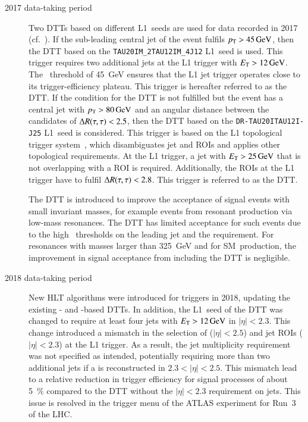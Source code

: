 \begin{description}
\item[2017 data-taking period] Two DTTs based on different L1~seeds are used for
  data recorded in 2017 (cf.~). If the sub-leading
  central jet of the event fulfils $p_{\text{T}} > \SI{45}{\ensuremath{\text{GeV}}}$, then the DTT based on
  the \texttt{TAU20IM\_2TAU12IM\_4J12} L1~seed is used. This trigger requires
  two additional jets at the L1 trigger with $\ET > \SI{12}{\GeV}$. The
  \pT~threshold of \SI{45}{\GeV} ensures that the L1 jet trigger operates close
  to its trigger-efficiency plateau. This trigger is hereafter referred to as
  the \FourJTwelve DTT. If the condition for the \FourJTwelve DTT is not
  fulfilled but the event has a central jet with $\pT > \SI{80}{\GeV}$ and an
  angular distance between the \tauhadvis candidates of $\Delta R(\tau, \tau) < 2.5$, then
  the DTT based on the \texttt{DR-TAU20ITAU12I-J25} L1~seed is considered. This
  trigger is based on the L1 topological trigger system~\cite{TRIG-2019-02},
  which disambiguates jet and \tauhadvis ROIs and applies other topological
  requirements. At the L1 trigger, a jet with $E_{\text{T}} > \SI{25}{\ensuremath{\text{GeV}}}$ that is not
  overlapping with a \tauhadvis ROI is required. Additionally, the \tauhadvis
  ROIs at the L1 trigger have to fulfil $\Delta R(\tau, \tau) < 2.8$. This trigger is
  referred to as the \LOneTopo DTT.

  The \FourJTwelve DTT is introduced to improve the acceptance of signal events
  with small \HH invariant masses, for example events from resonant \HH
  production via low-mass resonances. The \LOneTopo DTT has limited acceptance
  for such events due to the high \pT~thresholds on the leading jet and the
  \dRtautau requirement. For resonances with masses larger than \SI{325}{\GeV}
  and for SM~\HH production, the improvement in signal acceptance from including
  the \FourJTwelve DTT is negligible.

\item[2018 data-taking period] New HLT algorithms were introduced for \tauhadvis
  triggers in 2018, updating the existing \LOneTopo- and \FourJTwelve-based
  DTTs. In addition, the L1~seed of the \FourJTwelve DTT was changed to require
  at least four jets with $\ET > \SI{12}{\GeV}$ in $|\eta| < 2.3$. This change
  introduced a mismatch in the selection of \tauhadvis ($|\eta| < 2.5$) and jet
  ROIs ($|\eta| < 2.3$) at the L1 trigger. As a result, the jet multiplicity
  requirement was not specified as intended, potentially requiring more than two
  additional jets if a \tauhadvis is reconstructed in $2.3 < |\eta| < 2.5$. This
  mismatch lead to a relative reduction in trigger efficiency for signal
  processes of about \SI{5}{\percent} compared to the \FourJTwelve DTT without
  the $|\eta| < 2.3$ requirement on jets. This issue is resolved in the trigger
  menu of the ATLAS experiment for Run~3 of the LHC.
\end{description}


